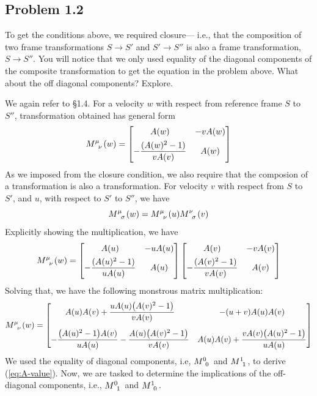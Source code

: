 	\subsection*{
		Problem 1.2
	}
	\begin{problem}
		To get the conditions above, we required closure--- i.e.,
		that the composition of two frame transformations $S\to S'$
		and $S'\to S''$ is also a frame transformation, $S\to S''$.
		You will notice that we only used equality of the diagonal 
		components of the composite transformation to get the equation
		in the problem above. What about the off diagonal components? Explore.
	\end{problem}
	\begin{solution_pset}
		We again refer to \S1.4\cite{juan2026}. For a velocity $w$ with respect from reference frame $S$ 
		to $S''$, transformation obtained has general form
		\begin{equation}
			\label{eq:Mw}
			M\indices{^\mu_\nu}(w)
			=
			\bmqty{
				A(w) & -vA(w) \\[4pt]
				- \dfrac{(A(w)^2-1)}{vA(v)} 
					 & A(w)
			}
		\end{equation}
		As we imposed from the closure condition, we also require
		that the composion of a transformation is also a transformation.
		For velocity $v$ with respect from $S$ to $S'$, and $u$, with respect to 
		$S'$ to $S''$, we have
		\begin{equation}
			\label{eq:Mw-MvMu}
			\tensor{M}{^\mu_\sigma}(w) = \tensor{M}{^\mu_\nu}(u)\tensor{M}{^\nu_\sigma}(v)
		\end{equation}
		Explicitly showing the multiplication, we have
		\[
			\tensor{M}{^\mu_\nu}(w) = 
			\bmqty{
				A(u) & -uA(u) \\[4pt]
				- \dfrac{(A(u)^2-1)}{uA(u)} 
					 & A(u)
			}
			\bmqty{
				A(v) & -vA(v) \\[4pt]
				- \dfrac{(A(v)^2-1)}{vA(v)} 
					 & A(v)
			}
		\]
		Solving that, we have the following monstrous matrix multiplication:
		{
			\begin{equation*}
			\tensor{M}{^\mu_\nu}(w) = 
			\begin{bmatrix}
				A(u)A(v) + \dfrac{uA(u)\bigl(A(v)^2-1\bigr)}{vA(v)} & 
				-(u+v)A(u)A(v) \\[14pt]
				-\dfrac{\bigl(A(u)^2-1\bigr)A(v)}{uA(u)} - \dfrac{A(u)\bigl(A(v)^2-1\bigr)}{vA(v)} & 
				A(u)A(v) + \dfrac{vA(v)\bigl(A(u)^2-1\bigr)}{uA(u)}
			\end{bmatrix}
			\end{equation*}
		}
		We used the equality of diagonal components, i.e, $M\indices{^0_0}$ and $M\indices{^1_1}$, 
		to derive (\ref{eq:A-value}). Now, we are tasked to determine the implications
		of the off-diagonal components, i.e., $M\indices{^0_1}$ and $M\indices{^1_0}$.


\end{solution_pset}
